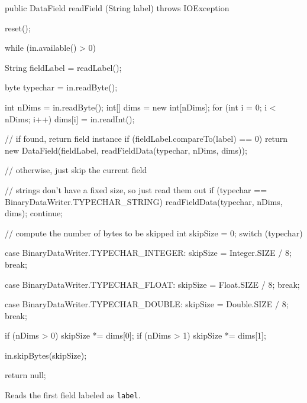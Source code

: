 \begin{code}

   public DataField readField (String label) throws IOException \begin{hide} {

      reset();

      while (in.available() > 0) {

         String fieldLabel = readLabel();

         byte typechar = in.readByte();

         int nDims = in.readByte();
         int[] dims = new int[nDims];
         for (int i = 0; i < nDims; i++)
            dims[i] = in.readInt();

         // if found, return field instance
         if (fieldLabel.compareTo(label) == 0)
            return new DataField(fieldLabel, readFieldData(typechar, nDims, dims));

         // otherwise, just skip the current field

         // strings don't have a fixed size, so just read them out
         if (typechar == BinaryDataWriter.TYPECHAR_STRING) {
            readFieldData(typechar, nDims, dims);
            continue;
         }

         // compute the number of bytes to be skipped
         int skipSize = 0;
         switch (typechar) {

            case BinaryDataWriter.TYPECHAR_INTEGER:
               skipSize = Integer.SIZE / 8;
               break;

            case BinaryDataWriter.TYPECHAR_FLOAT:
               skipSize = Float.SIZE / 8;
               break;

            case BinaryDataWriter.TYPECHAR_DOUBLE:
               skipSize = Double.SIZE / 8;
               break;
         }

         if (nDims > 0)
            skipSize *= dims[0];
         if (nDims > 1)
            skipSize *= dims[1];

         in.skipBytes(skipSize);
      }

      return null;
   }
   \end{hide}
\end{code}
\begin{tabb}
Reads the first field labeled as \texttt{label}.
\end{tabb}
\begin{htmlonly}
\end{htmlonly}

